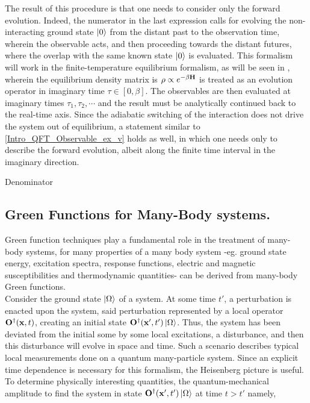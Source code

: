 The result of this procedure is that one needs to consider only the forward evolution.
Indeed, the numerator in the last expression calls for evolving the non-interacting ground state $\ket{0}$ from the distant past to the observation time, wherein the observable acts, and then proceeding towards the distant futures, where the overlap with the same known state $\ket{0}$ is evaluated. 
This formalism will work in the finite-temperature equilibrium formalism, as will be seen in , wherein the equilibrium density matrix is $\rho \propto e^{-\beta {\bf H}}$ is treated as an evolution operator in imaginary time $\tau \in [0, \beta]$. 
The observables are then evaluated at imaginary times $\tau_1, \tau_2, \cdots$ and the result must be analytically continued back to the real-time axis. Since the adiabatic switching of the interaction does not drive the system out of equilibrium, a statement similar to \cref{Intro_QFT_Observable_ex_v} holds as well, in which one needs only to describe the forward evolution, albeit along the finite time interval in the imaginary direction. \medbreak

Denominator



\subsection{Green Functions for Many-Body systems.}

Green function techniques play a fundamental role in the treatment of many-body systems, for many properties of a many body system -eg. ground state energy, excitation spectra, response functions, electric and magnetic susceptibilities and thermodynamic quantities- can be derived from many-body Green functions.\\

Consider the ground state $\ket{\Omega}$ of a system. At some time $t'$, a perturbation is enacted upon the system, said perturbation represented by a local operator ${\bf O}^\dagger({\bf x}, t)$, creating an initial state ${\bf O}^\dagger({\bf x}', t') \ket{\Omega}$. Thus, the system has been deviated from the initial some by some local excitations, a disturbance, and then this disturbance will evolve in space and time. Such a scenario describes typical local measurements done on a quantum many-particle system. Since an explicit time dependence is necessary for this formalism, the Heisenberg picture is useful. To determine physically interesting quantities, the quantum-mechanical amplitude to find the system in state ${\bf O}^\dagger({\bf x}', t') \ket{\Omega}$ at time $t > t'$ namely, 

